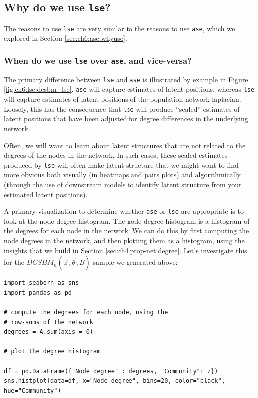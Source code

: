 \subsection{Why do we use \texttt{lse}?}

The reasons to use \texttt{lse} are very similar to the reasons to use \texttt{ase}, which we explored in Section \ref{sec:ch6:ase:whyuse}. 

\subsubsection{When do we use \texttt{lse} over \texttt{ase}, and vice-versa?}

The primary difference between \texttt{lse} and \texttt{ase} is illustrated by example in Figure \ref{fig:ch6:lse:dcsbm_lse}. \texttt{ase} will capture estimates of latent positions, whereas \texttt{lse} will capture estimates of latent positions of the population network laplacian. Loosely, this has the consequence that \texttt{lse} will produce ``scaled'' estimates of latent positions that have been adjusted for degree differences in the underlying network. 

Often, we will want to learn about latent structures that are not related to the degrees of the nodes in the network. In such cases, these scaled estimates produced by \texttt{lse} will often make latent structure that we might want to find more obvious both visually (in heatmaps and pairs plots) and algorithmically (through the use of downstream models to identify latent structure from your estimated latent positions). 

A primary visualization to determine whether \texttt{ase} or \texttt{lse} are appropriate is to look at the {node degree histogram}. The node degree histogram is a histogram of the degrees for each node in the network. We can do this by first computing the node degrees in the network, and then plotting them as a histogram, using the insights that we build in Section \ref{sec:ch4:prop-net:degree}. Let's investigate this for the $DCSBM_n(\vec z, \vec \theta, B)$ sample we generated above:

\begin{lstlisting}[style=python]
import seaborn as sns
import pandas as pd

# compute the degrees for each node, using the
# row-sums of the network
degrees = A.sum(axis = 0)

# plot the degree histogram

df = pd.DataFrame({"Node degree" : degrees, "Community": z})
sns.histplot(data=df, x="Node degree", bins=20, color="black", hue="Community")
\end{lstlisting}

